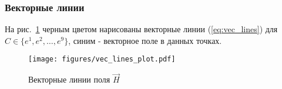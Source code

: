 \begin{frame}\frametitle{Векторные линии}
  На рис.~\ref{fig:vec_lines} черным цветом нарисованы векторные линии (\ref{eq:vec_lines})
  для $C \in \{e^1, e^2, \ldots, e^9\}$, синим - векторное поле в данных точках.
	\begin{figure}
		\centering
		\texttt{[image: figures/vec\_lines\_plot.pdf]}
		\caption{Векторные линии поля \(\vec H\)}\label{fig:vec_lines}
	\end{figure}

\end{frame}
